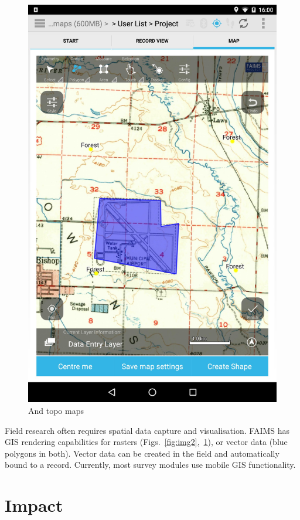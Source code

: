 \documentclass[preprint,12pt, a4paper]{elsarticle}
\begin{document}
\begin{figure}[!htb]
\includegraphics[width=\linewidth]{image-3.jpg}
	\caption{And topo maps}
	\label{fig:img3}
\endminipage\hfill

\end{figure}



Field research often requires spatial data capture and visualisation. FAIMS has GIS rendering capabilities for rasters (Figs.~\ref{fig:img2},~\ref{fig:img3}), or vector data (blue polygons in both). Vector data can be created in the field and automatically bound to a record. Currently, most survey modules use mobile GIS functionality. 


\section{Impact}
\end{document}
